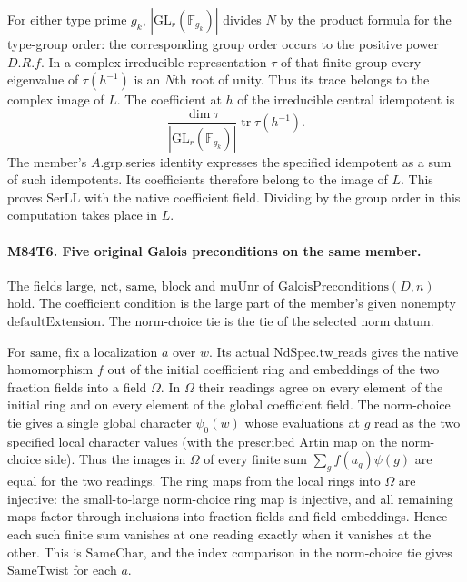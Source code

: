 For either type prime $g_k$, $|\mathrm{GL}_r(\mathbb F_{g_k})|$
divides $N$ by the product formula for the type-group order:
the corresponding group order occurs to the positive power
$D.R.f$. In a complex irreducible representation $\tau$ of
that finite group every eigenvalue of $\tau(h^{-1})$ is an
$N$th root of unity. Thus its trace belongs to the complex
image of $L$. The coefficient at $h$ of the irreducible central
idempotent is
\[
      \frac{\dim\tau}{|\mathrm{GL}_r(\mathbb F_{g_k})|}
                          \operatorname{tr}\tau(h^{-1}).
\]
The member's $A.\mathrm{grp}$.series identity expresses the
specified idempotent as a sum of such idempotents. Its
coefficients therefore belong to the image of $L$. This proves
$\mathrm{SerLL}$ with the native coefficient field. Dividing
by the group order in this computation takes place in $L$.

\paragraph{M84T6. Five original Galois preconditions on the same member.}
The fields $\mathrm{large}$, $\mathrm{nct}$, $\mathrm{same}$,
$\mathrm{block}$ and $\mathrm{muUnr}$ of $\mathrm{GaloisPreconditions}(D,n)$ hold.
The coefficient condition is the $\mathrm{large}$ part of the
member's given nonempty $\mathrm{defaultExtension}$. The
norm-choice tie is the tie of the selected norm datum.

For $\mathrm{same}$, fix a localization $a$ over $w$. Its
actual $\mathrm{NdSpec}.\mathrm{tw\_reads}$ gives the
native homomorphism $f$ out of the initial coefficient ring
and embeddings of the two fraction fields into a field
$\Omega$. In $\Omega$ their readings agree on every element of
the initial ring and on every element of the global coefficient
field. The norm-choice tie gives a single global character
$\psi_0(w)$ whose evaluations at $g$ read as the two specified
local character values (with the prescribed Artin map on the
norm-choice side). Thus the images in $\Omega$ of every finite
sum $\sum_g f(a_g)\psi(g)$ are equal for the two readings.
The ring maps from the local rings into $\Omega$ are injective:
the small-to-large norm-choice ring map is injective, and all
remaining maps factor through inclusions into fraction fields
and field embeddings. Hence each such finite sum vanishes
at one reading exactly when it vanishes at the other. This
is $\mathrm{SameChar}$, and the index comparison in the
norm-choice tie gives $\mathrm{SameTwist}$ for each $a$.

